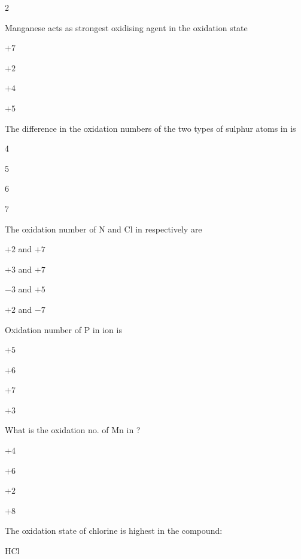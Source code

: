 \documentclass[10pt,a4paper]{article}
\begin{document}
\begin{multicols}{2}
\begin{questions}[start=56]
\item Manganese acts as strongest oxidising agent in the oxidation state
\begin{options}
  \item $+7$
  \item $+2$
  \item $+4$
  \item $+5$
\end{options}

\item The difference in the oxidation numbers of the two types of sulphur atoms in  is
\begin{options}
  \item 4
  \item 5
  \item 6
  \item 7
\end{options}

\item The oxidation number of N and Cl in  respectively are
\begin{options}
  \item $+2$ and $+7$
  \item $+3$ and $+7$
  \item $-3$ and $+5$
  \item $+2$ and $-7$
\end{options}

\item Oxidation number of P in  ion is
\begin{options}
  \item $+5$
  \item $+6$
  \item $+7$
  \item $+3$
\end{options}

\item What is the oxidation no. of Mn in ?
\begin{options}
  \item $+4$
  \item $+6$
  \item $+2$
  \item $+8$
\end{options}

\item The oxidation state of chlorine is highest in the compound:
\begin{options}
  \item {}
  \item HCl
  \item {}
  \item {}
\end{options}


\end{questions}
\end{multicols}
\end{document}

